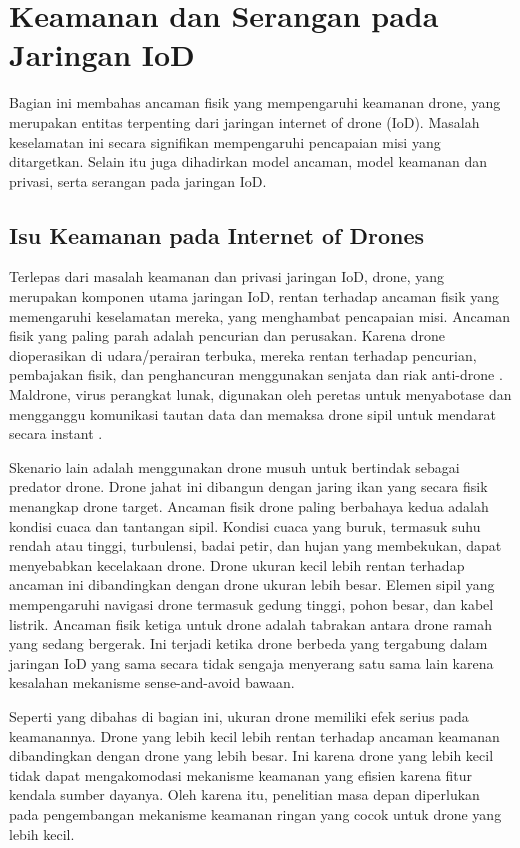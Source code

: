\section{Keamanan dan Serangan pada Jaringan IoD}
\label{sec:keamanandrone}

Bagian ini membahas ancaman fisik yang mempengaruhi keamanan drone, yang merupakan entitas terpenting dari jaringan internet of drone (IoD). Masalah keselamatan ini secara signifikan mempengaruhi pencapaian misi yang ditargetkan. Selain itu juga dihadirkan model ancaman, model keamanan dan privasi, serta serangan pada jaringan IoD.

\subsection{Isu Keamanan pada Internet of Drones}
\label{subsec:isukeamanandrone}

Terlepas dari masalah keamanan dan privasi jaringan IoD, drone, yang merupakan komponen utama jaringan IoD, rentan terhadap ancaman fisik yang memengaruhi keselamatan mereka, yang menghambat pencapaian misi. Ancaman fisik yang paling parah adalah pencurian dan perusakan. Karena drone dioperasikan di udara/perairan terbuka, mereka rentan terhadap pencurian, pembajakan fisik, dan penghancuran menggunakan senjata dan riak anti-drone \citep{euchi2021drones}. Maldrone, virus perangkat lunak, digunakan oleh peretas untuk menyabotase dan mengganggu komunikasi tautan data dan memaksa drone sipil untuk mendarat secara instant \citep{dahlman2019game}. 

Skenario lain adalah menggunakan drone musuh untuk bertindak sebagai predator drone. Drone jahat ini dibangun dengan jaring ikan yang secara fisik menangkap drone target. Ancaman fisik drone paling berbahaya kedua adalah kondisi cuaca dan tantangan sipil. Kondisi cuaca yang buruk, termasuk suhu rendah atau tinggi, turbulensi, badai petir, dan hujan yang membekukan, dapat menyebabkan kecelakaan drone. Drone ukuran kecil lebih rentan terhadap ancaman ini dibandingkan dengan drone ukuran lebih besar. Elemen sipil yang mempengaruhi navigasi drone termasuk gedung tinggi, pohon besar, dan kabel listrik. Ancaman fisik ketiga untuk drone adalah tabrakan antara drone ramah yang sedang bergerak. Ini terjadi ketika drone berbeda yang tergabung dalam jaringan IoD yang sama secara tidak sengaja menyerang satu sama lain karena kesalahan mekanisme sense-and-avoid bawaan.

Seperti yang dibahas di bagian ini, ukuran drone memiliki efek serius pada keamanannya. Drone yang lebih kecil lebih rentan terhadap ancaman keamanan dibandingkan dengan drone yang lebih besar. Ini karena drone yang lebih kecil tidak dapat mengakomodasi mekanisme keamanan yang efisien karena fitur kendala sumber dayanya. Oleh karena itu, penelitian masa depan diperlukan pada pengembangan mekanisme keamanan ringan yang cocok untuk drone yang lebih kecil.

